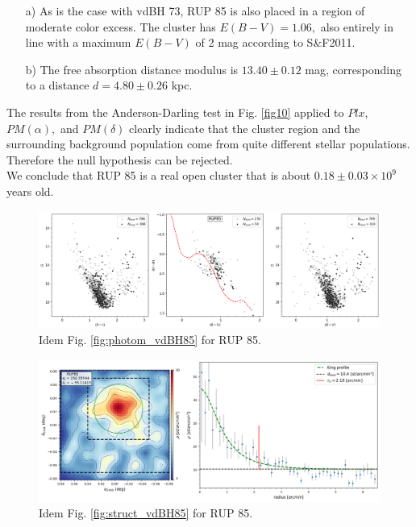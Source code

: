 \documentclass[draft]{aa}
\begin{document}
\begin{itemize}
\item [a)] As is the case with vdBH 73, RUP 85 is also placed
in a region of moderate color excess. The cluster has $E(B-V)=1.06,$
also entirely in line with a maximum $E(B-V)$ of 2 mag according to S\&F2011.
\item [b)] The free absorption distance modulus is $13.40\pm0.12$ mag,
corresponding to a distance $d=4.80\pm0.26$ kpc.
\end{itemize}

The results from the Anderson-Darling test in Fig. \ref{fig10} applied to $Plx$,
$PM(\alpha),$ and $PM(\delta)$ clearly indicate that the cluster region and the
surrounding background population come from quite different stellar populations.
Therefore the null hypothesis can be rejected.\\

We conclude that RUP 85 is a real open cluster that is about $0.18\pm0.03\times10^9$
years old.

\begin{figure}[ht]
    \centering
    \includegraphics[width=\hsize]{../figs/obs_RUP85.png}
    \caption{Idem Fig. \ref{fig:photom_vdBH85} for RUP 85.}
    \label{fig7}
\end{figure}

\begin{figure}[ht]
    \centering
    \includegraphics[width=\hsize]{../figs/dmap_rup85.png}
    \caption{Idem Fig. \ref{fig:struct_vdBH85} for RUP 85.}
    \label{fig8}
\end{figure}
\end{document}

